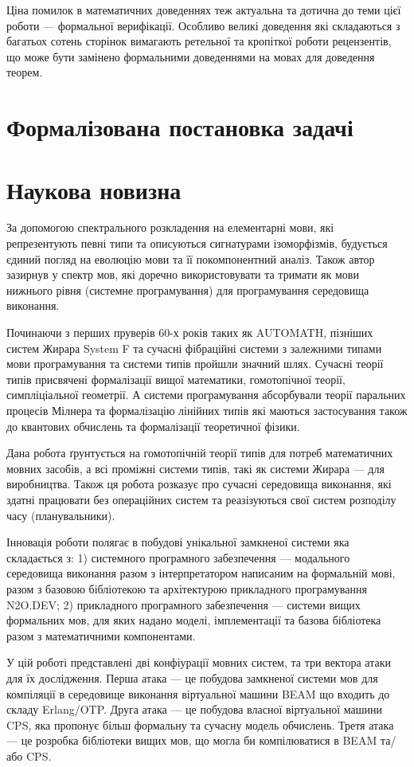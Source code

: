 Ціна помилок в математичних доведеннях теж актуальна та дотична до теми цієї роботи ---
формальної верифікації. Особливо великі доведення які складаються з багатьох сотень
 сторінок вимагають ретельної та кропіткої роботи рецензентів, що може бути замінено
формальними доведеннями на мовах для доведення теорем.

\section{Формалізована постановка задачі}

\section{Наукова новизна}
За допомогою спектрального розкладення на елементарні мови, які репрезентують
певні типи та описуються сигнатурами ізоморфізмів, будується єдиний погляд на
еволюцію мови та її покомпонентний аналіз. Також автор зазирнув у спектр мов,
які доречно використовувати та тримати як мови нижнього рівня (системне програмування)
для програмування середовища виконання.

Починаючи з перших пруверів 60-х років таких як AUTOMATH, пізніших систем Жирара
System F та сучасні фібраційні системи з залежними типами мови програмування та
системи типів пройшли значний шлях. Сучасні теорії типів присвячені формалізації
вищої математики, гомотопічної теорії, симпліціальної геометрії. А системи
програмування абсорбували теорії паральних процесів Мілнера та формалізацію
лінійних типів які маються застосування також до квантових обчислень та формалізації
теоретичної фізики.

Дана робота ґрунтується на гомотопічній теорії типів для потреб математичних
мовних засобів, а всі проміжні системи типів, такі як системи Жирара --- для
виробництва. Також ця робота розказує про сучасні середовища виконання, які
здатні працювати без операційних систем та реазізуються свої систем розподілу
часу (планувальники).

Інновація роботи полягає в побудові унікальної замкненої системи яка
складається з: 1) системного програмного забезпечення --- модального середовища
виконання разом з інтерпретатором написаним на формальній мові, разом з
базовою бібліотекою та архітектурою прикладного програмування N2O.DEV;
2) прикладного програмного забезпечення --- системи вищих формальних мов,
для яких надано моделі, імплементації та базова бібліотека разом з математичними
компонентами.

У цій роботі представлені дві конфіурації мовних систем, та три вектора атаки для їх дослідження.
Перша атака --- це побудова замкненої системи мов для компіляції в середовище виконання віртуальної машини BEAM що входить до складу Erlang/OTP.
Друга атака --- це побудова власної віртуальної машини CPS, яка пропонує більш формальну та сучасну модель обчислень.
Третя атака --- це розробка бібліотеки вищих мов, що могла би компілюватися в BEAM та/або CPS.

